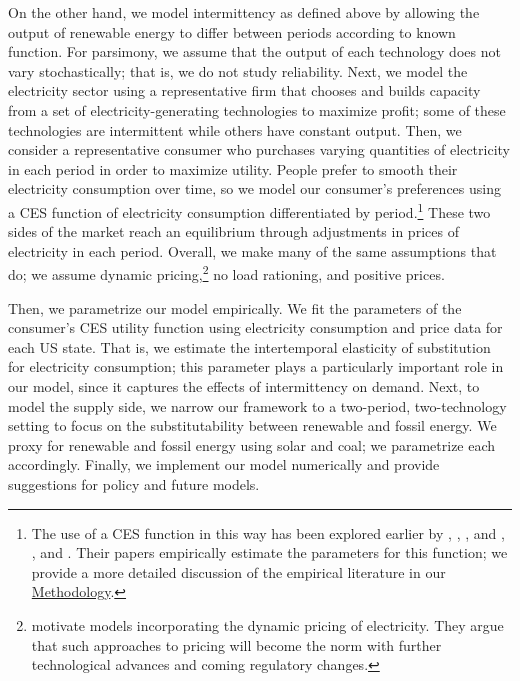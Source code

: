 \documentclass[11pt,a4paper]{extarticle}
\begin{document}
On the other hand,  we model intermittency as defined above by allowing the output of renewable energy to differ between periods according to known function. For parsimony, we assume that the output of each technology  does not vary stochastically; that is, we do not study reliability. Next, we model the electricity sector using a representative firm that chooses and builds capacity from a set of electricity-generating technologies to maximize profit; some of these technologies are intermittent while others have constant output. Then, we consider a representative consumer who purchases varying quantities of electricity in each period in order to maximize utility. People prefer to smooth their electricity consumption over time, so we model our consumer's preferences using a CES function of electricity consumption differentiated by period.\footnote{ The use of a CES function in this way has been explored earlier by \citet{Schwarz}, \citet{Schwarz}, \citet{Herriges}, and \citet{KS1994}, \citet{Aubin}, and \citet{Moha2016}. Their papers empirically estimate the parameters for this function; we provide a more detailed discussion of the empirical literature in our \hyperref[sec:methodology]{Methodology}.} These two sides of the market reach an equilibrium through adjustments in prices of electricity in each period. Overall, we make many of the same assumptions that \citet{HH} do; we assume dynamic pricing,\footnote{ \citeauthor{HH} motivate models incorporating the dynamic pricing of electricity. They argue that such approaches to pricing will become the norm with further technological advances and coming regulatory changes.} no load rationing, and positive prices. 

Then, we parametrize our model empirically. We fit the parameters of the consumer's CES utility function using electricity consumption and price data for each US state. That is, we estimate the intertemporal elasticity of substitution for electricity consumption; this parameter plays a particularly important role in our model, since it captures the effects of intermittency on demand. Next, to model the supply side, we narrow our framework to a two-period, two-technology setting to focus on the substitutability between renewable and fossil energy. We proxy for renewable and fossil energy using solar and coal; we parametrize each accordingly. Finally, we implement our model numerically and provide suggestions for policy and future models. 
\end{document}
